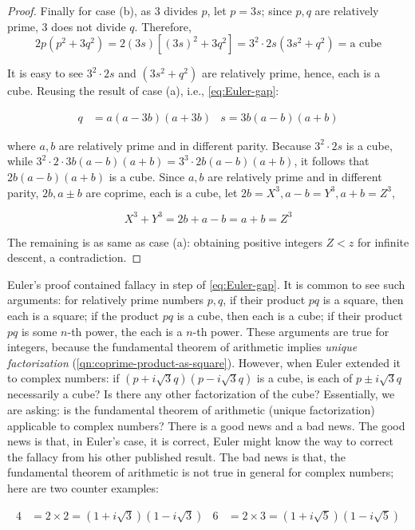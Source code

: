 \documentclass[b5paper]{article}
\begin{document}
\begin{proof}
Finally for case (b), as 3 divides $p$, let $p = 3s$; since $p, q$ are relatively prime, 3 does not divide $q$. Therefore,
\[
2p(p^2 + 3q^2) = 2(3s)[(3s)^2 + 3q^2] = 3^2\cdot 2s(3s^2 + q^2) = \text{a cube}
\]

It is easy to see $3^2\cdot 2s$ and $(3s^2 + q^2)$ are relatively prime, hence, each is a cube. Reusing the result of case (a), i.e., \cref{eq:Euler-gap}:

\begin{align*}
q &= a(a - 3b)(a + 3b)  &  s = 3b(a - b)(a + b)
\end{align*}

where $a, b$ are relatively prime and in different parity. Because $3^2\cdot 2s$ is a cube, while $3^2\cdot 2 \cdot 3b(a - b)(a + b) = 3^3 \cdot 2b(a - b)(a + b)$, it follows that $2b(a - b)(a + b)$ is a cube. Since $a, b$ are relatively prime and in different parity, $2b, a \pm b$ are coprime, each is a cube, let $2b = X^3, a - b = Y^3, a + b = Z^3$,

\[
X^3 + Y^3 = 2b + a - b = a + b = Z^3
\]

The remaining is as same as case (a): obtaining positive integers $Z < z$ for infinite descent, a contradiction.
\end{proof}

Euler's proof contained fallacy in step of \cref{eq:Euler-gap}. It is common to see such arguments: for relatively prime numbers $p, q$, if their product $pq$ is a square, then each is a square; if the product $pq$ is a cube, then each is a cube; if their product $pq$ is some $n$-th power, the each is a $n$-th power. These arguments are true for integers, because the fundamental theorem of arithmetic implies \emph{unique factorization} (\cref{qn:coprime-product-as-square}). However, when Euler extended it to complex numbers: if $(p + i\sqrt{3}q)(p - i\sqrt{3}q)$ is a cube, is each of $p \pm i\sqrt{3}q$ necessarily a cube? Is there any other factorization of the cube? Essentially, we are asking: is the fundamental theorem of arithmetic (unique factorization) applicable to complex numbers? There is a good news and a bad news. The good news is that, in Euler's case, it is correct, Euler might know the way to correct the fallacy from his other published result. The bad news is that, the fundamental theorem of arithmetic is not true in general for complex numbers; here are two counter examples:

\begin{align*}
4 &= 2 \times 2 = (1 + i\sqrt{3})(1 - i\sqrt{3}) & 6 &= 2 \times 3 = (1 + i\sqrt{5})(1 - i\sqrt{5})
\end{align*}
\end{document}
